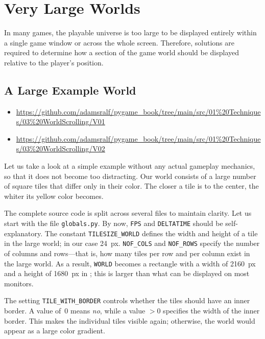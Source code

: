 \newpage
\section{Very Large Worlds}\label{secLargeWorld}

In many games, the playable universe is too large to be displayed entirely within a single game window or across the whole screen. Therefore, solutions are required to determine how a section of the game world should be displayed relative to the player’s position.

\subsection{A Large Example World}
\begin{diskbox}
	\begin{itemize}
		\item \url{https://github.com/adamsralf/pygame_book/tree/main/src/01%20Techniques/03%20WorldScrolling/V01}
		\item \url{https://github.com/adamsralf/pygame_book/tree/main/src/01%20Techniques/03%20WorldScrolling/V02}
	\end{itemize}
\end{diskbox}

Let us take a look at a simple example without any actual gameplay mechanics, so that it does not become too distracting. Our world consists of a large number of square tiles that differ only in their color. The closer a tile is to the center, the whiter its yellow color becomes.

The complete source code is split across several files to maintain clarity. Let us start with the file \texttt{globals.py}. By now, \texttt{FPS} and \texttt{DELTATIME} should be self-explanatory. The constant \texttt{TILESIZE\_WORLD} defines the width and height of a tile in the large world; in our case \SI{24}{px}. \texttt{NOF\_COLS} and \texttt{NOF\_ROWS} specify the number of columns and rows—that is, how many tiles per row and per column exist in the large world. As a result, \texttt{WORLD} becomes a rectangle with a width of \SI{2160}{px} and a height of \SI{1680}{px} in ; this is larger than what can be displayed on most monitors.

The setting \texttt{TILE\_WITH\_BORDER} controls whether the tiles should have an inner border. A value of~0 means \emph{no}, while a value $>0$ specifies the width of the inner border. This makes the individual tiles visible again; otherwise, the world would appear as a large color gradient.

